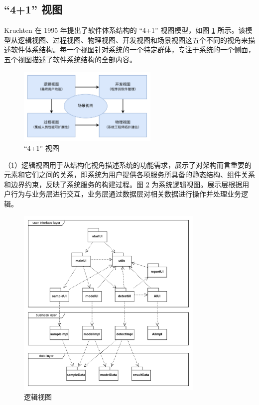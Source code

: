 \documentclass[
  ]{njuthesis}
\begin{document}
\subsection{“4+1” 视图}

Kruchten 在 1995 年提出了软件体系结构的 “4+1” 视图模型，如图 \ref{4+1视图} 所示。该模型从逻辑视图、过程视图、物理视图、开发视图和场景视图这五个不同的视角来描述软件体系结构。每一个视图针对系统的一个特定群体，专注于系统的一个侧面，五个视图描述了软件系统结构的全部内容\cite{[15]}。

\begin{figure}[htb]
    \centering
    \includegraphics[width=0.6\textwidth]{images/4+1视图.png}
    \caption{“4+1” 视图}
    \label{4+1视图}
\end{figure}

（1）逻辑视图用于从结构化视角描述系统的功能需求，展示了对架构而言重要的元素和它们之间的关系，即系统为用户提供各项服务所具备的静态结构、组件关系和边界约束，反映了系统服务的构建过程。图 \ref{逻辑视图} 为系统逻辑视图。展示层根据用户行为与业务层进行交互，业务层通过数据层对相关数据进行操作并处理业务逻辑。

\begin{figure}[H]
    \centering
    \includegraphics[width=0.8\textwidth]{images/逻辑视图.png}
    \caption{逻辑视图}
    \label{逻辑视图}
\end{figure}
\end{document}
